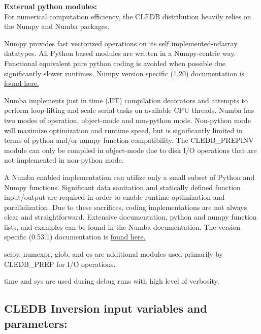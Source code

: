 \documentclass{article}
\begin{document}
\textbf{\large External python modules:\\}
For numerical computation efficiency, the CLEDB distribution heavily relies on the Numpy and Numba packages. 
\begin{description} [font=\normalfont,leftmargin=0.6in,style=multiline]
	\item[Numpy]
Numpy provides fast vectorized operations on its self implemented-ndarray datatypes. All Python based modules are written in a Numpy-centric way. Functional equivalent pure python coding is avoided when possible due significantly slower runtimes. Numpy version specific (1.20) documentation is \href{https://numpy.org/doc/1.20/}{found here.}
	\item[Numba]
Numba implements just in time (JIT) compilation decorators and attempts to perform loop-lifting and scale serial tasks on available CPU threads. Numba has two modes of operation, object-mode and non-python mode. Non-python mode will maximize optimization and runtime speed, but is significantly limited in terms of python and/or numpy function compatibility. The CLEDB\_PREPINV module can only be compiled in object-mode due to disk I/O operations that are not implemented in non-python mode.

A Numba enabled implementation can utilize only a small subset of Python and Numpy functions. Significant data sanitation and statically defined function input/output are required in order to enable runtime optimization and parallelization. Due to these sacrifices, coding implementations are not always clear and straightforward. Extensive documentation, python and numpy function lists, and examples can be found in the Numba documentation. The version specific (0.53.1) documentation is \href{https://numba.readthedocs.io/en/0.53.1/}{found here.}
	\item[Others]
scipy, numexpr, glob, and os are additional modules used primarily by CLEDB\_PREP for I/O operations.
	\item[]
time and sys are used during debug runs with high level of verbosity.
\end{description}


\newpage
\subsection*{CLEDB Inversion input variables and parameters:}
\end{document}
